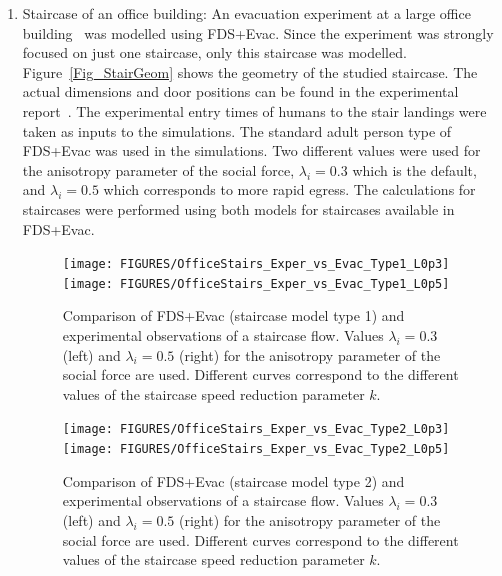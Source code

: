 \documentclass[12pt,a4paper,final,twoside]{stylevk}
\begin{document}
\begin{enumerate}
%
\item Staircase of an office building: An evacuation experiment at a
  large office building~\cite{Hostikka07b} was modelled using
  FDS+Evac.  Since the experiment was strongly focused on just one
  staircase, only this staircase was modelled.
  Figure~\ref{Fig_StairGeom} shows the geometry of the studied
  staircase.  The actual dimensions and door positions can be found in
  the experimental report~\cite{Hostikka07b}.  The experimental entry
  times of humans to the stair landings were taken as inputs to the
  simulations.  The standard adult person type of FDS+Evac was used in
  the simulations.  Two different values were used for the anisotropy
  parameter of the social force, $\lambda_i=0.3$ which is the default,
  and $\lambda_i=0.5$ which corresponds to more rapid egress.  The
  calculations for staircases were performed using both models for
  staircases available in FDS+Evac.
  

%
\begin{figure}[!tb]
  \centerline{\texttt{[image: FIGURES/OfficeStairs\_Exper\_vs\_Evac\_Type1\_L0p3]}\texttt{[image: FIGURES/OfficeStairs\_Exper\_vs\_Evac\_Type1\_L0p5]}}
  \caption{Comparison of FDS+Evac (staircase model type 1) and experimental
    observations of a staircase flow.  Values $\lambda_i=0.3$ (left)
    and $\lambda_i=0.5$ (right) for the anisotropy parameter of the
    social force are used.  Different curves correspond to the
    different values of the staircase speed reduction parameter
    $k$.}\label{Fig_StairType1}
\end{figure}
%

%
\begin{figure}[!tb]
  \centerline{\texttt{[image: FIGURES/OfficeStairs\_Exper\_vs\_Evac\_Type2\_L0p3]}\texttt{[image: FIGURES/OfficeStairs\_Exper\_vs\_Evac\_Type2\_L0p5]}}
  \caption{Comparison of FDS+Evac (staircase model type 2) and
    experimental observations of a staircase flow.  Values
    $\lambda_i=0.3$ (left) and $\lambda_i=0.5$ (right) for the
    anisotropy parameter of the social force are used.  Different
    curves correspond to the different values of the staircase speed
    reduction parameter $k$.}\label{Fig_StairType2}
\end{figure}


\end{enumerate}
\end{document}
